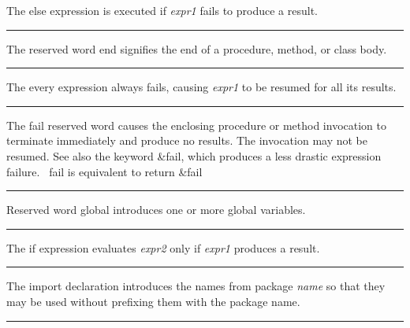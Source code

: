 \noindent
{}The \textsf{else} expression is executed if \textit{expr1}
fails to produce a result.

\bigskip\hrule\vspace{0.1cm}

\noindent
{}The reserved word \textsf{end} signifies the end of a
procedure, method, or class body.

\bigskip\hrule\vspace{0.1cm}

\noindent
{}The \textsf{every} expression always fails, causing
\textit{expr1} to be resumed for all its results.

\bigskip\hrule\vspace{0.1cm}

\noindent
{}The \textsf{fail} reserved word causes the enclosing
procedure or method invocation to terminate immediately and produce no
results. The invocation may not be resumed. See also the keyword
\textsf{\&fail}, which produces a less drastic expression failure.
\ \textsf{fail} is equivalent to \textsf{return \&fail}

\bigskip\hrule\vspace{0.1cm}

\noindent
{}Reserved word \textsf{global} introduces one or more
global variables.

\bigskip\hrule\vspace{0.1cm}

\noindent
{}The \textsf{if} expression evaluates \textit{expr2} only if
\textit{expr1} produces a result.

\bigskip\hrule\vspace{0.1cm}

\noindent
{}The \textsf{import} declaration introduces the names from
package \textit{name} so that they may be used without prefixing them
with the package name.

\bigskip\hrule\vspace{0.1cm}

